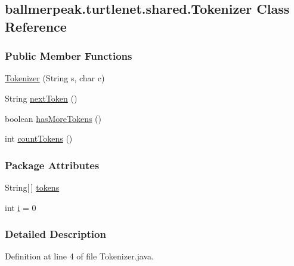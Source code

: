 \hypertarget{classballmerpeak_1_1turtlenet_1_1shared_1_1Tokenizer}{\subsection{ballmerpeak.\-turtlenet.\-shared.\-Tokenizer Class Reference}
\label{classballmerpeak_1_1turtlenet_1_1shared_1_1Tokenizer}
}
\subsubsection*{Public Member Functions}
\begin{DoxyCompactItemize}
\item 
\hyperlink{classballmerpeak_1_1turtlenet_1_1shared_1_1Tokenizer_a5aabdd62ed478d9d0693741b000aed81}{Tokenizer} (String s, char c)
\item 
String \hyperlink{classballmerpeak_1_1turtlenet_1_1shared_1_1Tokenizer_aaa2e2f9a3abb9557ab3e11e7f7103c3d}{next\-Token} ()
\item 
boolean \hyperlink{classballmerpeak_1_1turtlenet_1_1shared_1_1Tokenizer_a4a3ca279fc748a7afcd37fd50bc533d4}{has\-More\-Tokens} ()
\item 
int \hyperlink{classballmerpeak_1_1turtlenet_1_1shared_1_1Tokenizer_a9e57ee02e894bf1291ae702ecc0fa11f}{count\-Tokens} ()
\end{DoxyCompactItemize}
\subsubsection*{Package Attributes}
\begin{DoxyCompactItemize}
\item 
String\mbox{[}$\,$\mbox{]} \hyperlink{classballmerpeak_1_1turtlenet_1_1shared_1_1Tokenizer_a776a32b36d0990c7008b7ae2084ff178}{tokens}
\item 
int \hyperlink{classballmerpeak_1_1turtlenet_1_1shared_1_1Tokenizer_a97d589eb1229875bb10e4ab062a1489a}{i} = 0
\end{DoxyCompactItemize}


\subsubsection{Detailed Description}


Definition at line 4 of file Tokenizer.\-java.



